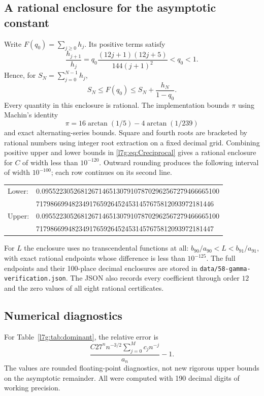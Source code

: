 \documentclass[11pt,letterpaper]{article}
\newcommand{\file}[1]{\nolinkurl{#1}}
\theoremstyle{remark}\newtheorem{remark}[theorem]{Remark}
\newcounter{l7gtrsavedeq}
\begin{document}
\subsection{A rational enclosure for the asymptotic constant}

Write $F(q_0)=\sum_{j\ge0}h_j$. Its positive terms satisfy
\[
 \frac{h_{j+1}}{h_j}
 =q_0\frac{(12j+1)(12j+5)}{144(j+1)^2}<q_0<1.
\]
Hence, for $S_N=\sum_{j=0}^{N-1}h_j$,
\begin{equation}\label{l7g:eq:Fbound}
 S_N\le F(q_0)\le S_N+\frac{h_N}{1-q_0}.
\end{equation}
Every quantity in this enclosure is rational. The implementation bounds
$\pi$ using Machin's identity
\[
 \pi=16\arctan(1/5)-4\arctan(1/239)
\]
and exact alternating-series bounds. Square and fourth roots are
bracketed by rational numbers using integer root extraction on a fixed
decimal grid. Combining positive upper and lower bounds in
\eqref{l7g:eq:Creciprocal} gives a rational enclosure for $C$ of width less
than $10^{-120}$. Outward rounding produces the following interval of
width $10^{-100}$; each row continues on its second line.

\begin{center}\small\ttfamily
\begin{tabular}{ll}
Lower:&0.09552230526812671465130791078702962567279466665100\\
      &71798669948234917659264524531457675812093972181446\\[3pt]
Upper:&0.09552230526812671465130791078702962567279466665100\\
      &71798669948234917659264524531457675812093972181447
\end{tabular}
\end{center}

For $L$ the enclosure uses no transcendental functions at all:
$b_{90}/a_{90}<L<b_{91}/a_{91}$, with exact rational endpoints whose
difference is less than $10^{-125}$. The full endpoints and their
100-place decimal enclosures are stored in
\file{data/58-gamma-verification.json}. The JSON also records every
coefficient through order $12$ and the zero values of all eight rational
certificates.

\subsection{Numerical diagnostics}

For Table~\ref{l7g:tab:dominant}, the relative error is
\[
 \frac{C27^nn^{-3/2}\sum_{j=0}^{M}c_jn^{-j}}{a_n}-1.
\]
The values are rounded floating-point diagnostics, not new rigorous
upper bounds on the asymptotic remainder. All were computed with
190 decimal digits of working precision.
\end{document}
